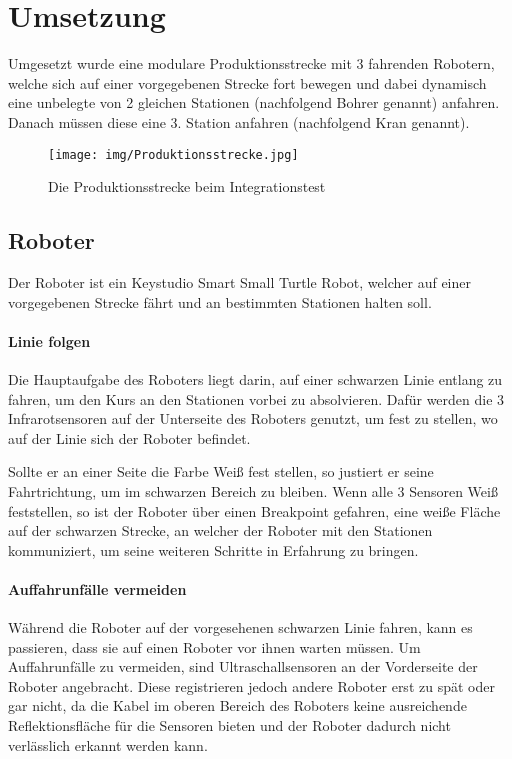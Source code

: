\chapter{Umsetzung}
Umgesetzt wurde eine modulare Produktionsstrecke mit 3 fahrenden Robotern, welche sich auf einer vorgegebenen Strecke fort bewegen und dabei dynamisch eine unbelegte von 2 gleichen Stationen (nachfolgend Bohrer genannt) anfahren. Danach müssen diese eine 3. Station anfahren (nachfolgend Kran genannt).
\begin{figure}[h]
\begin{center}
\texttt{[image: img/Produktionsstrecke.jpg]}
\caption{Die Produktionsstrecke beim Integrationstest}
\end{center}
\end{figure}

\section{Roboter}
Der Roboter ist ein Keystudio Smart Small Turtle Robot, welcher auf einer vorgegebenen Strecke fährt und an bestimmten Stationen halten soll.
\subsubsection{Linie folgen}
Die Hauptaufgabe des Roboters liegt darin, auf einer schwarzen Linie entlang zu fahren, um den Kurs an den Stationen vorbei zu absolvieren. Dafür werden die 3 Infrarotsensoren auf der Unterseite des Roboters genutzt, um fest zu stellen, wo auf der Linie sich der Roboter befindet.

Sollte er an einer Seite die Farbe Weiß fest stellen, so justiert er seine Fahrtrichtung, um im schwarzen Bereich zu bleiben. Wenn alle 3 Sensoren Weiß feststellen, so ist der Roboter über einen Breakpoint gefahren, eine weiße Fläche auf der schwarzen Strecke, an welcher der Roboter mit den Stationen kommuniziert, um seine weiteren Schritte in Erfahrung zu bringen.

\subsubsection{Auffahrunfälle vermeiden}
Während die Roboter auf der vorgesehenen schwarzen Linie fahren, kann es passieren, dass sie auf einen Roboter vor ihnen warten müssen. Um Auffahrunfälle zu vermeiden, sind Ultraschallsensoren an der Vorderseite der Roboter angebracht. Diese registrieren jedoch andere Roboter erst zu spät oder gar nicht, da die Kabel im oberen Bereich des Roboters keine ausreichende Reflektionsfläche für die Sensoren bieten und der Roboter dadurch nicht verlässlich erkannt werden kann.

